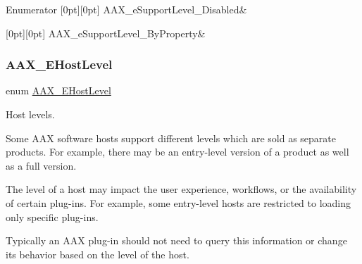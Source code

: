 \begin{DoxyEnumFields}{Enumerator}
[0pt][0pt]{}\mbox{\label{a00491_aca7bf42860665d5da66f4ac342e761b3ab6a4f0a0ab04481d4279010e8eaf6e09}} 
A\+A\+X\+\_\+e\+Support\+Level\+\_\+\+Disabled&\\
\hline

[0pt][0pt]{}\mbox{\label{a00491_aca7bf42860665d5da66f4ac342e761b3ac7b3a489a9972ac6f16b7c7763706fee}} 
A\+A\+X\+\_\+e\+Support\+Level\+\_\+\+By\+Property&\\
\hline

\end{DoxyEnumFields}
\mbox{\label{a00491_a2d34e7a7c2e6f4f6361555ad02869219}} 
\subsubsection{\texorpdfstring{AAX\_EHostLevel}{AAX\_EHostLevel}}
{\footnotesize\ttfamily enum \mbox{\hyperlink{a00491_a2d34e7a7c2e6f4f6361555ad02869219}{A\+A\+X\+\_\+\+E\+Host\+Level}}}



Host levels. 

Some A\+AX software hosts support different levels which are sold as separate products. For example, there may be an entry-\/level version of a product as well as a full version.

The level of a host may impact the user experience, workflows, or the availability of certain plug-\/ins. For example, some entry-\/level hosts are restricted to loading only specific plug-\/ins.

Typically an A\+AX plug-\/in should not need to query this information or change its behavior based on the level of the host.

